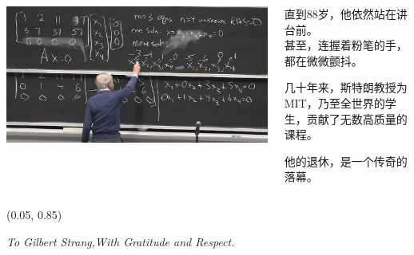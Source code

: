 \documentclass{beamer}
\begin{document}
\begin{frame}
    \begin{columns}[T]
        \begin{column}{0.5\textwidth}
            \includegraphics[width=\textwidth]{assets/linear.png}
        \end{column}
        
        \begin{column}{0.5\textwidth}
            \vspace{1cm}
            \large
            直到88岁，他依然站在讲台前。 \\
            \vspace{0.5cm}
            \Large
            甚至，连握着粉笔的手，都在微微颤抖。
            
            \vfill %
            
            \normalsize
            几十年来，斯特朗教授为MIT，乃至全世界的学生，贡献了无数高质量的课程。
            
            \vfill

            \large
            他的退休，是一个传奇的落幕。

        \end{column}
    \end{columns}
    
    \begin{textblock*}{0.9\textwidth}(0.05\paperwidth, 0.85\paperheight)
        \begin{center}
            \textit{To Gilbert Strang,With Gratitude and Respect.}
        \end{center}
    \end{textblock*}
\end{frame}
\end{document}
